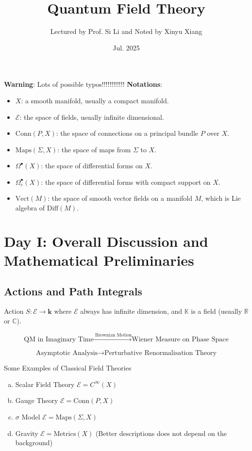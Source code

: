 \documentclass[10pt]{article}
\title{\textbf{Quantum Field Theory}}
\author{Lectured by Prof. Si Li and Noted by Xinyu Xiang}
\date{Jul. 2025}
\begin{document}
\maketitle

\textbf{Warning}: Lots of possible typos!!!!!!!!!!!!
\textbf{Notations}:
\begin{itemize}
  \item $ X$: a smooth manifold, usually a compact manifold.
  \item $ \mathcal{E}$: the space of fields, usually infinite dimensional.
  \item $ \mathrm{Conn}(P,X)$: the space of connections on a principal bundle $ P$ over $ X$.
  \item $ \text{Maps}(\Sigma, X)$: the space of maps from $\Sigma$ to $ X$.
  \item $ \Omega^{\bullet}(X)$: the space of differential forms on $ X$.
  \item $ \Omega^{\bullet}_{c}(X)$: the space of differential forms with compact support on $ X$.
  \item $ \mathrm{Vect}(M)$: the space of smooth vector fields on a manifold $ M$, which is Lie algebra of $ \mathrm{Diff}(M)$.
\end{itemize}

\section{Day I: Overall Discussion and Mathematical Preliminaries}

\subsection{Actions and Path Integrals}

Action $ S: \mathcal{E} \rightarrow \mathbf{k}$ where $ \mathcal{E}$ always has infinite dimension, and $ \mathbb{K}$ is a field (usually $ \mathbb{R}$ or $ \mathbb{C}$).

\begin{equation*}
  \text{QM in Imaginary Time} \xrightarrow{\text{ Brownian Motion}} \text{Wiener Measure on Phase Space}
\end{equation*}

\begin{equation*}
  \text{Asymptotic Analysis} \xrightarrow{\quad} \text{Perturbative Renormalisation Theory}
\end{equation*}

\begin{example} Some Examples of Classical Field Theories
  \begin{enumerate}[(a)]
    \item Scalar Field Theory $ \mathcal{E} = C^{\infty }(X)$
    \item Gauge Theory $ \mathcal{E} = \mathrm{Conn}(P,X)$
    \item $ \sigma$ Model $ \mathcal{E} = \text{Maps}(\Sigma, X)$
    \item Gravity $ \mathcal{E} = \text{Metrics}(X)$ (Better descriptions does not depend on the background)
  \end{enumerate}
\end{example}
\end{document}
